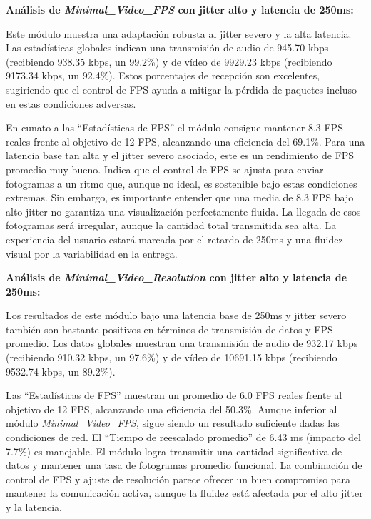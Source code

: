 \vspace{\baselineskip}

\textbf{Análisis de \textit{Minimal\_Video\_FPS} con jitter alto y latencia de 250ms:}
\vspace{\baselineskip}

Este módulo muestra una adaptación robusta al jitter severo y la alta latencia. Las estadísticas globales indican una transmisión de audio de 945.70 kbps (recibiendo 938.35 kbps, un 99.2\%) y de vídeo de 9929.23 kbps (recibiendo 9173.34 kbps, un 92.4\%). Estos porcentajes de recepción son excelentes, sugiriendo que el control de FPS ayuda a mitigar la pérdida de paquetes incluso en estas condiciones adversas.
\vspace{\baselineskip}

En cunato a las ``Estadísticas de FPS'' el módulo consigue mantener 8.3 FPS reales frente al objetivo de 12 FPS, alcanzando una eficiencia del 69.1\%. Para una latencia base tan alta y el jitter severo asociado, este es un rendimiento de FPS promedio muy bueno. Indica que el control de FPS se ajusta para enviar fotogramas a un ritmo que, aunque no ideal, es sostenible bajo estas condiciones extremas. Sin embargo, es importante entender que una media de 8.3 FPS bajo alto jitter no garantiza una visualización perfectamente fluida. La llegada de esos fotogramas será irregular, aunque la cantidad total transmitida sea alta. La experiencia del usuario estará marcada por el retardo de 250ms y una fluidez visual por la variabilidad en la entrega.

\vspace{\baselineskip}

\textbf{Análisis de \textit{Minimal\_Video\_Resolution} con jitter alto y latencia de 250ms:}
\vspace{\baselineskip}

Los resultados de este módulo bajo una latencia base de 250ms y jitter severo también son bastante positivos en términos de transmisión de datos y FPS promedio. Los datos globales muestran una transmisión de audio de 932.17 kbps (recibiendo 910.32 kbps, un 97.6\%) y de vídeo de 10691.15 kbps (recibiendo 9532.74 kbps, un 89.2\%).
\vspace{\baselineskip}

Las ``Estadísticas de FPS'' muestran un promedio de 6.0 FPS reales frente al objetivo de 12 FPS, alcanzando una eficiencia del 50.3\%. Aunque inferior al módulo \textit{Minimal\_Video\_FPS}, sigue siendo un resultado suficiente dadas las condiciones de red. El ``Tiempo de reescalado promedio'' de 6.43 ms (impacto del 7.7\%) es manejable. El módulo logra transmitir una cantidad significativa de datos y mantener una tasa de fotogramas promedio funcional. La combinación de control de FPS y ajuste de resolución parece ofrecer un buen compromiso para mantener la comunicación activa, aunque la fluidez está afectada por el alto jitter y la latencia.

